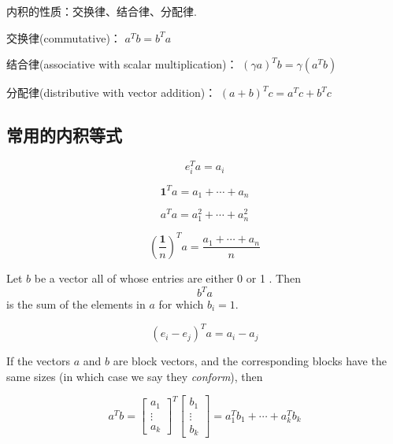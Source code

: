 \begin{theorem}
    内积的性质：交换律、结合律、分配律. 

交换律(commutative)： \( a^{T} b=b^{T} a \)

结合律(associative with scalar multiplication)： \( (\gamma a)^{T} b=\gamma\left(a^{T} b\right) \)

分配律(distributive with vector addition)： \( (a+b)^{T} c=a^{T} c+b^{T} c \)
\end{theorem}


\subsection{常用的内积等式}
\begin{corollary}[选出第$i$项]
    $$ e_{i}^{T} a=a_{i} $$
\end{corollary}

\begin{corollary}[向量每一项之和]
    $$ \mathbf{1}^{T} a=a_{1}+\cdots+a_{n} $$
\end{corollary}

\begin{corollary}[向量每一项的平方和]
    $$ a^{T} a=a_{1}^{2}+\cdots+a_{n}^{2} $$
\end{corollary}

\begin{corollary}[向量元素的平均值]
    $$ (\frac{\mathbf{1}}{n})^{T} a= \frac{a_{1}+\cdots+a_{n}}{n}  $$
\end{corollary}

\begin{corollary}
    Let $ b $ be a vector all of whose entries are either 0 or 1 . Then $$ b^{T} a $$ is the sum of the elements in $ a $ for which $ b_{i}=1 $.
\end{corollary}

\begin{corollary}[Differencing]
    $$ \left(e_{i}-e_{j}\right)^{T} a=a_{i}-a_{j} $$
\end{corollary}

\begin{definition}
    If the vectors $ a $ and $ b $ are block vectors, and the corresponding blocks have the same sizes (in which case we say they \textit{conform}), then 

    $$ a^{T} b=\left[\begin{array}{c}a_{1} \\ \vdots \\ a_{k}\end{array}\right]^{T}\left[\begin{array}{c}b_{1} \\ \vdots \\ b_{k}\end{array}\right]=a_{1}^{T} b_{1}+\cdots+a_{k}^{T} b_{k} $$
\end{definition}


